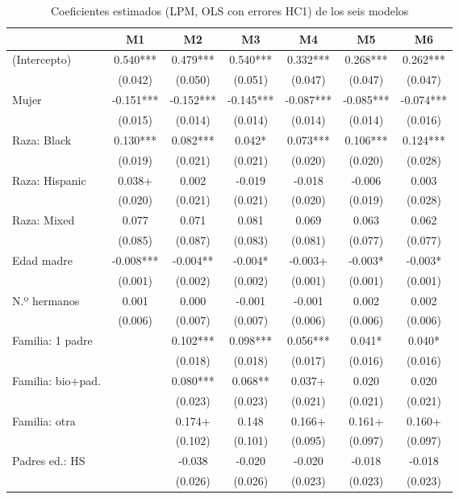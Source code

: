 \documentclass[11pt]{article}
\begin{document}
\begin{table}[H]
\centering
\caption{Coeficientes estimados (LPM, OLS con errores HC1) de los seis modelos}
\label{tab:coefs}
\scriptsize
\begin{tabular}{lcccccc}
\toprule
 & M1 & M2 & M3 & M4 & M5 & M6 \\
\midrule
(Intercepto) & 0.540*** & 0.479*** & 0.540*** & 0.332*** & 0.268*** & 0.262*** \\
 & (0.042) & (0.050) & (0.051) & (0.047) & (0.047) & (0.047) \\
Mujer & -0.151*** & -0.152*** & -0.145*** & -0.087*** & -0.085*** & -0.074*** \\
 & (0.015) & (0.014) & (0.014) & (0.014) & (0.014) & (0.016) \\
Raza: Black & 0.130*** & 0.082*** & 0.042* & 0.073*** & 0.106*** & 0.124*** \\
 & (0.019) & (0.021) & (0.021) & (0.020) & (0.020) & (0.028) \\
Raza: Hispanic & 0.038+ & 0.002 & -0.019 & -0.018 & -0.006 & 0.003 \\
 & (0.020) & (0.021) & (0.021) & (0.020) & (0.019) & (0.028) \\
Raza: Mixed & 0.077 & 0.071 & 0.081 & 0.069 & 0.063 & 0.062 \\
 & (0.085) & (0.087) & (0.083) & (0.081) & (0.077) & (0.077) \\
Edad madre & -0.008*** & -0.004** & -0.004* & -0.003+ & -0.003* & -0.003* \\
 & (0.001) & (0.002) & (0.002) & (0.001) & (0.001) & (0.001) \\
N.º hermanos & 0.001 & 0.000 & -0.001 & -0.001 & 0.002 & 0.002 \\
 & (0.006) & (0.007) & (0.007) & (0.006) & (0.006) & (0.006) \\
Familia: 1 padre &  & 0.102*** & 0.098*** & 0.056*** & 0.041* & 0.040* \\
 &  & (0.018) & (0.018) & (0.017) & (0.016) & (0.016) \\
Familia: bio+pad. &  & 0.080*** & 0.068** & 0.037+ & 0.020 & 0.020 \\
 &  & (0.023) & (0.023) & (0.021) & (0.021) & (0.021) \\
Familia: otra &  & 0.174+ & 0.148 & 0.166+ & 0.161+ & 0.160+ \\
 &  & (0.102) & (0.101) & (0.095) & (0.097) & (0.097) \\
Padres ed.: HS &  & -0.038 & -0.020 & -0.020 & -0.018 & -0.018 \\
 &  & (0.026) & (0.026) & (0.023) & (0.023) & (0.023) \\

\end{tabular}
\end{table}
\end{document}
